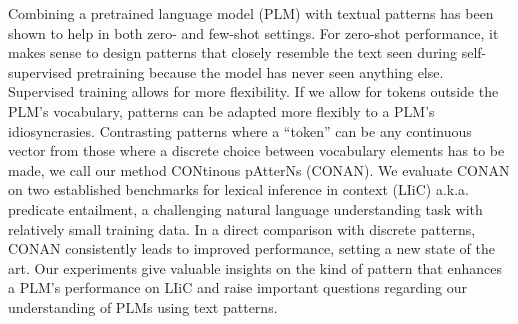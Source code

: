 Combining a pretrained language model (PLM) with textual patterns has been shown to help in both zero- and few-shot settings. For zero-shot performance, it makes sense to design patterns that closely resemble the text seen during self-supervised pretraining because the model has never seen anything else. Supervised training allows for more flexibility. If we allow for tokens outside the PLM's vocabulary, patterns can be adapted more flexibly to a PLM's idiosyncrasies. Contrasting patterns where a ``token'' can be any continuous vector from those where a discrete choice between vocabulary elements has to be made, we call our method CONtinous pAtterNs (CONAN). We evaluate CONAN on two established benchmarks for lexical inference in context (LIiC) a.k.a. predicate entailment, a challenging natural language understanding task with relatively small training data. In a direct comparison with discrete patterns, CONAN consistently leads to improved performance, setting a new state of the art. Our experiments give valuable insights on the kind of pattern that enhances a PLM's performance on LIiC and raise important questions regarding our understanding of PLMs using text patterns.
